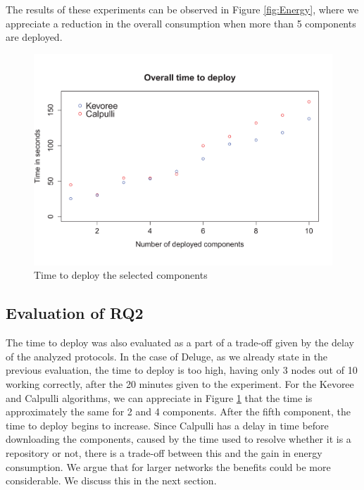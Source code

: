 The results of these experiments can be observed in Figure \ref{fig:Energy}, where we appreciate a reduction in the overall consumption when more than 5 components are deployed.

\begin{figure}[htb]
	\centering
	\includegraphics[width=0.95\columnwidth]{chapters/calpulli.images/timeWithFonts.pdf}
	\caption{Time to deploy the selected components} \label{fig:Time}
\end{figure}

\subsection{Evaluation of RQ2}

The time to deploy was also evaluated as a part of a trade-off given by the delay of the analyzed protocols.
In the case of Deluge, as we already state in the previous evaluation, the time to deploy is too high, having only 3 nodes out of 10 working correctly, after the 20 minutes given to the experiment.
For the Kevoree and Calpulli algorithms, we can appreciate in Figure \ref{fig:Time} that the time is approximately the same for 2 and 4 components.
After the fifth component, the time to deploy begins to increase. Since Calpulli has a delay in time before downloading the components, caused by the time used to resolve whether it is a repository or not, there is a trade-off between this and the gain in energy consumption. We argue that for larger networks the benefits could be more considerable. We discuss this in the next section.

